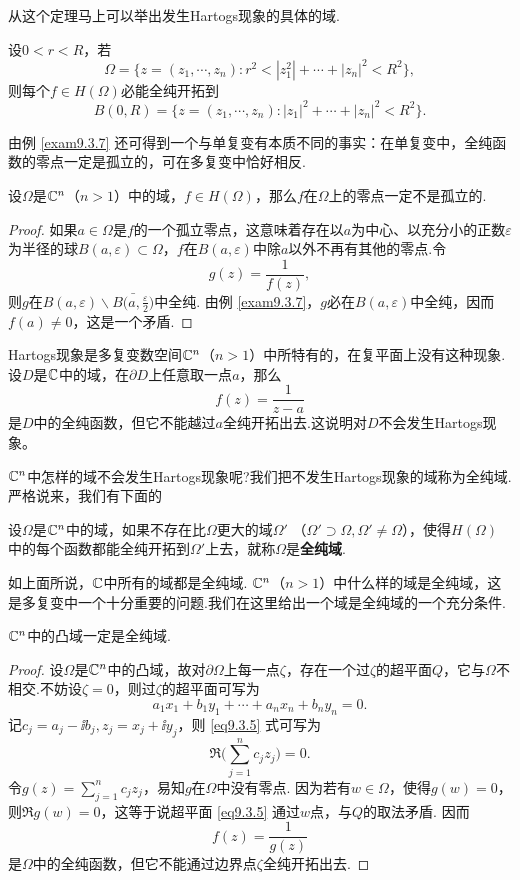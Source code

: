 从这个定理马上可以举出发生Hartogs现象的具体的域.
\begin{example}\label{exam9.3.7}
  设$0<r<R$，若
  \[
    \Omega = \{z=(z_1,\cdots,z_n):r^2 < |z_1^2| + \cdots + |z_n|^2 < R^2\},
  \]
  则每个$f\in H(\Omega)$必能全纯开拓到
  \[
    B(0,R) = \{z=(z_1,\cdots,z_n):|z_1|^2+\cdots+|z_n|^2<R^2\}.
  \]
\end{example}

由例 \ref{exam9.3.7} 还可得到一个与单复变有本质不同的事实：在单复变中，全纯函数的零点一定是孤立的，可在多复变中恰好相反.
\begin{theorem}\label{thm9.3.8}
  设$\Omega$是$\mathbb C^n$（$n>1$）中的域，$f\in H(\Omega)$，那么$f$在$\Omega$上的零点一定不是孤立的.
\end{theorem}
\begin{proof}
  如果$a\in\Omega$是$f$的一个孤立零点，这意味着存在以$a$为中心、以充分小的正数$\varepsilon$为半径的球$B(a,\varepsilon)\subset\Omega$，$f$在$B(a,\varepsilon)$中除$a$以外不再有其他的零点.令
  \[
    g(z) = \frac1{f(z)},
  \]
  则$g$在$B(a,\varepsilon)\backslash\bar{B\bigg(a,\frac\varepsilon2\bigg)}$中全纯. 由例 \ref{exam9.3.7}，$g$必在$B(a,\varepsilon)$中全纯，因而$f(a)\ne0$，这是一个矛盾.
\end{proof}

Hartogs现象是多复变数空间$\mathbb C^n$（$n>1$）中所特有的，在复平面上没有这种现象.设$D$是$\mathbb C$中的域，在$\partial D$上任意取一点$a$，那么
\[
  f(z) = \frac1{z-a}
\]
是$D$中的全纯函数，但它不能越过$a$全纯开拓出去.这说明对$D$不会发生Hartogs现象。

$\mathbb C^n$中怎样的域不会发生Hartogs现象呢?我们把不发生Hartogs现象的域称为全纯域.严格说来，我们有下面的
\begin{definition}\label{def9.3.9}
  设$\Omega$是$\mathbb C^n$中的域，如果不存在比$\Omega$更大的域$\Omega'$
  （$\Omega'\supset\Omega,\Omega'\ne\Omega$），使得$H(\Omega)$中的每个函数都能全纯开拓到$\Omega'$上去，就称$\Omega$是\textbf{全纯域}.
\end{definition}

如上面所说，$\mathbb C$中所有的域都是全纯域. $\mathbb C^n$（$n>1$）中什么样的域是全纯域，这是多复变中一个十分重要的问题.我们在这里给出一个域是全纯域的一个充分条件.
\begin{theorem}\label{thm9.3.10}
  $\mathbb C^n$中的凸域一定是全纯域.
\end{theorem}
\begin{proof}
  设$\Omega$是$\mathbb C^n$中的凸域，故对$\partial\Omega$上每一点$\zeta$，存在一个过$\zeta$的超平面$Q$，它与$\Omega$不相交.不妨设$\zeta=0$，则过$\zeta$的超平面可写为
  \begin{equation}\label{eq9.3.5}
    a_1x_1 + b_1y_1 + \cdots + a_nx_n + b_ny_n = 0.
  \end{equation}
  记$c_j=a_j-\ii b_j,z_j=x_j+\ii y_j$，则 \eqref{eq9.3.5} 式可写为
  \[
    \Re\bigg(\sum_{j=1}^nc_jz_j\bigg) = 0.
  \]
  令$g(z)=\sum_{j=1}^nc_jz_j$，易知$g$在$\Omega$中没有零点. 因为若有$w\in\Omega$，使得$g(w)=0$，则$\Re g(w)=0$，这等于说超平面 \eqref{eq9.3.5} 通过$w$点，与$Q$的取法矛盾. 因而
  \[
    f(z) = \frac1{g(z)}
  \]
  是$\Omega$中的全纯函数，但它不能通过边界点$\zeta$全纯开拓出去.
\end{proof}

